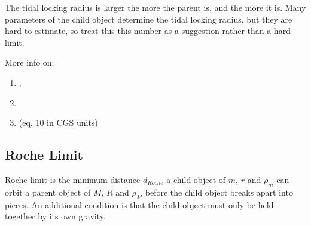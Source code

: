 \documentclass[letterpaper,10pt,english]{sphinxmanual}
\begin{document}
\sphinxAtStartPar
The tidal locking radius is larger the more {\hyperref[\detokenize{quantities/material/mass:id1}]{}} the parent is,
and the more {\hyperref[\detokenize{quantities/life/age:id1}]{}} it is. Many parameters of the child object
determine the tidal locking radius, but they are hard to estimate,
so treat this this number as a suggestion rather than a hard limit.

\sphinxAtStartPar
More info on:
\begin{enumerate}
%
\item {} 
\sphinxAtStartPar
{},

\item {} 
\sphinxAtStartPar
{}

\item {} 
\sphinxAtStartPar
{} (eq. 10 in CGS units)

\end{enumerate}


\subsection{Roche Limit}
\label{\detokenize{quantities/children_orbit_limits/roche_limit:roche-limit}}\label{\detokenize{quantities/children_orbit_limits/roche_limit::doc}}\label{\detokenize{quantities/children_orbit_limits/roche_limit:id1}}
\sphinxAtStartPar
Roche limit is the minimum distance \(d_{Roche}\) a child object of {\hyperref[\detokenize{quantities/material/mass:id1}]{}} \(m\),
{\hyperref[\detokenize{quantities/geometric/radius:id1}]{}} \(r\) and {\hyperref[\detokenize{quantities/material/density:id1}]{}} \(\rho_m\) can orbit a parent object of
{\hyperref[\detokenize{quantities/material/mass:id1}]{}} \(M\), {\hyperref[\detokenize{quantities/geometric/radius:id1}]{}} \(R\) and {\hyperref[\detokenize{quantities/material/density:id1}]{}} \(\rho_M\)
before the child object breaks apart into pieces. An additional condition is that
the child object must only be held together by its own gravity.
\end{document}
